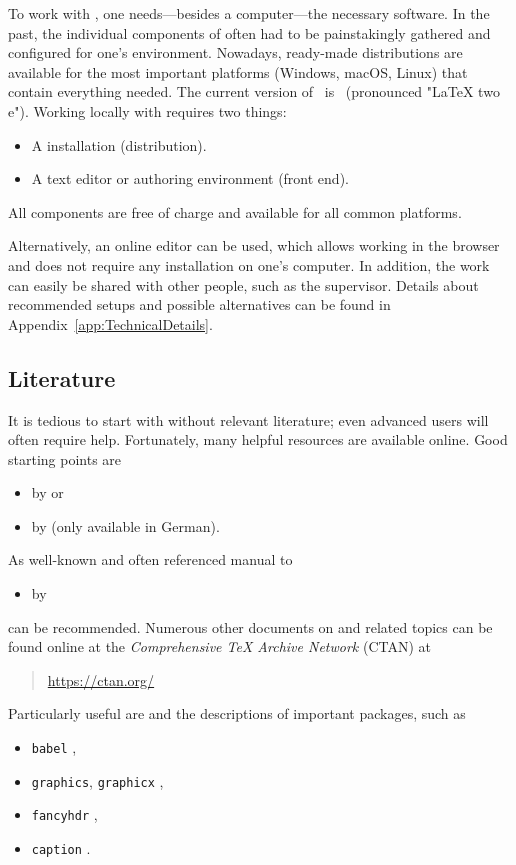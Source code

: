 To work with \latex, one needs---besides a computer---the necessary software. In
the past, the individual components of \latex often had to be painstakingly
gathered and configured for one's environment. Nowadays, ready-made
distributions are available for the most important platforms (Windows, macOS,
Linux) that contain everything needed. The current version of \latex\ is
\LaTeXe\ (pronounced "LaTeX two e"). Working locally with \latex requires two
things:
%
\begin{itemize}
    \item A \latex installation (distribution).
    \item A text editor or authoring environment (front end).
\end{itemize}
%
All components are free of charge and available for all common platforms.

Alternatively, an online editor can be used, which allows working in the browser
and does not require any installation on one's computer. In addition, the work
can easily be shared with other people, such as the supervisor. Details about
recommended setups and possible alternatives can be found in
Appendix~\ref{app:TechnicalDetails}.

\subsection{Literature}
\label{sec:literature}

It is tedious to start with \latex without relevant literature; even advanced
users will often require help. Fortunately, many helpful resources are available
online. Good starting points are \eg
%
\begin{itemize}
    \item {} by \textcite{Oetiker2021} or
	\item {} by \textcite{Daniel2018} (only available in German).

\end{itemize}
%
\noindent
As well-known and often referenced manual to \latex 
%
\begin{itemize}
    \item {} by \textcite{Kopka2003}
\end{itemize}
%
can be recommended. Numerous other documents on \latex and related topics can be
found online at the \emph{Comprehensive TeX Archive Network} (CTAN) at
%
\begin{quote}
    \url{https://ctan.org/}
\end{quote}
%
Particularly useful are  \cite{Pakin2021} and the
descriptions of important \latex packages, such as
%
\begin{itemize}
    \item[] \texttt{babel} \cite{Bezos2022},
    \item[] \texttt{graphics}, \texttt{graphicx} \cite{Carlisle2021},
    \item[] \texttt{fancyhdr} \cite{Oostrum2022},
    \item[] \texttt{caption} \cite{Sommerfeldt2022}.
\end{itemize}


